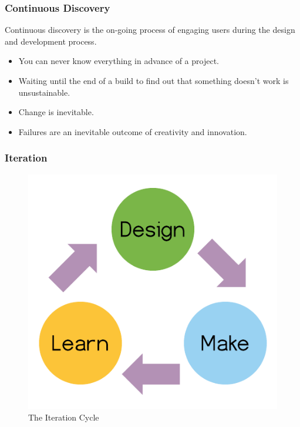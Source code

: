 \begin{frame}
	\frametitle{Continuous Discovery}
	Continuous discovery is the on-going process of engaging users during the design and development process. 
	\begin{itemize}
		\item \pause You can never know everything in advance of a project.
		\item \pause Waiting until the end of a build to find out that something doesn't work is unsustainable. 
		\item \pause Change is inevitable.
		\item \pause Failures are an inevitable outcome of creativity and innovation. 
	\end{itemize}
\end{frame}	

\begin{frame}
	\frametitle{Iteration}
	\begin{figure}
		\includegraphics[scale=0.4]{assets/iteration.png}
		\caption{The Iteration Cycle}
	\end{figure}
\end{frame}


